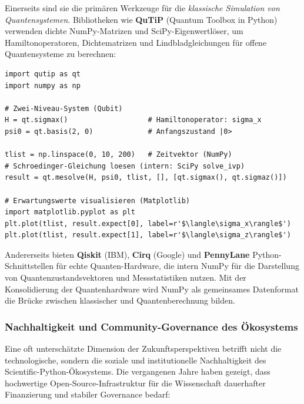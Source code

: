 \documentclass[12pt, a4paper]{article}
\begin{document}
Einerseits sind sie die primären Werkzeuge für die \emph{klassische Simulation
von Quantensystemen}. Bibliotheken wie \textbf{QuTiP} (Quantum Toolbox in
Python) verwenden dichte NumPy-Matrizen und SciPy-Eigenwertlöser, um
Hamiltonoperatoren, Dichtematrizen und Lindbladgleichungen für offene
Quantensysteme zu berechnen:

\begin{lstlisting}[caption={QuTiP: Quantendynamik mit NumPy/SciPy}]
import qutip as qt
import numpy as np

# Zwei-Niveau-System (Qubit)
H = qt.sigmax()                   # Hamiltonoperator: sigma_x
psi0 = qt.basis(2, 0)             # Anfangszustand |0>

tlist = np.linspace(0, 10, 200)   # Zeitvektor (NumPy)
# Schroedinger-Gleichung loesen (intern: SciPy solve_ivp)
result = qt.mesolve(H, psi0, tlist, [], [qt.sigmax(), qt.sigmaz()])

# Erwartungswerte visualisieren (Matplotlib)
import matplotlib.pyplot as plt
plt.plot(tlist, result.expect[0], label=r'$\langle\sigma_x\rangle$')
plt.plot(tlist, result.expect[1], label=r'$\langle\sigma_z\rangle$')
\end{lstlisting}

Andererseits bieten \textbf{Qiskit} (IBM), \textbf{Cirq} (Google) und
\textbf{PennyLane} Python-Schnittstellen für echte Quanten-Hardware, die
intern NumPy für die Darstellung von Quantenzustandsvektoren und
Messstatistiken nutzen. Mit der Konsolidierung der Quantenhardware wird
NumPy als gemeinsames Datenformat die Brücke zwischen klassischer und
Quantenberechnung bilden.

\subsubsection{Nachhaltigkeit und Community-Governance des Ökosystems}
\label{subsubsec:governance}

Eine oft unterschätzte Dimension der Zukunftsperspektiven betrifft nicht
die technologische, sondern die soziale und institutionelle Nachhaltigkeit
des Scientific-Python-Ökosystems. Die vergangenen Jahre haben gezeigt,
dass hochwertige Open-Source-Infrastruktur für die Wissenschaft dauerhafter
Finanzierung und stabiler Governance bedarf:
\end{document}
